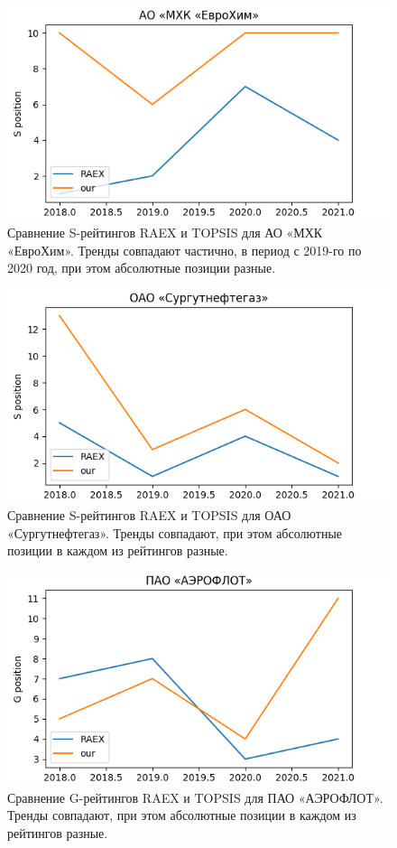 \documentclass[a4paper, 14pt]{extarticle}
\begin{document}
\begin{figure}[H]
\centering
\includegraphics[width=0.8\linewidth]{images/S_АО «МХК «ЕвроХим».png}
\caption{Сравнение S-рейтингов RAEX и TOPSIS для АО «МХК «ЕвроХим». Тренды совпадают частично, в период с 2019-го по 2020 год, при этом абсолютные позиции разные.}
\label{fig:s_evrohim}
\end{figure}

\begin{figure}[H]
\centering
\includegraphics[width=0.8\linewidth]{images/S_ОАО «Сургутнефтегаз».png}
\caption{Сравнение S-рейтингов RAEX и TOPSIS для ОАО «Сургутнефтегаз». Тренды совпадают, при этом абсолютные позиции в каждом из рейтингов разные.}
\label{fig:s_surgutneftegaz}
\end{figure}

\begin{figure}[H]
\centering
\includegraphics[width=0.8\linewidth]{images/G_ПАО «АЭРОФЛОТ».png}
\caption{Сравнение G-рейтингов RAEX и TOPSIS для ПАО «АЭРОФЛОТ». Тренды совпадают, при этом абсолютные позиции в каждом из рейтингов разные.}
\label{fig:g_aeroflot}
\end{figure}
\end{document}
